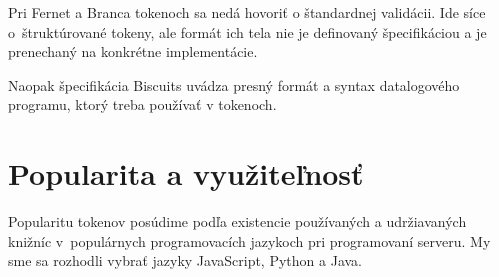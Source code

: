 Pri Fernet a Branca tokenoch sa nedá hovoriť o štandardnej validácii. Ide síce o~štruktúrované tokeny, ale formát ich tela nie je definovaný špecifikáciou a je prenechaný na konkrétne implementácie.

Naopak špecifikácia Biscuits uvádza presný formát a syntax datalogového programu, ktorý treba používať v tokenoch.

\section{Popularita a využiteľnosť}

Popularitu tokenov posúdime podľa existencie používaných a udržiavaných knižníc v~populárnych programovacích jazykoch pri programovaní serveru. My sme sa rozhodli vybrať jazyky JavaScript, Python a Java.

